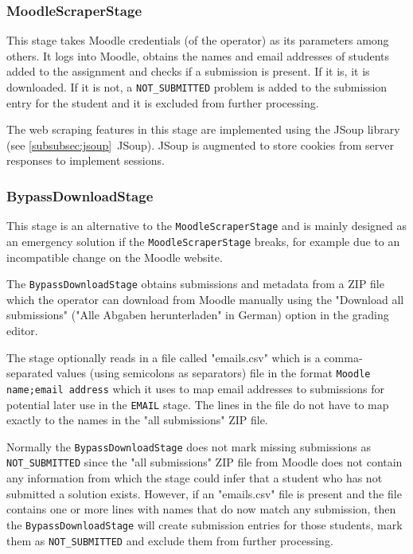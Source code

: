 \documentclass[12pt,a4paper,oneside]{report}
\begin{document}
	\subsubsection{MoodleScraperStage}
	This stage takes Moodle credentials (of the operator) as its parameters among others. It logs into Moodle, obtains the names and email addresses of students added to the assignment and checks if a submission is present. If it is, it is downloaded. If it is not, a \lstinline|NOT_SUBMITTED| problem is added to the submission entry for the student and it is excluded from further processing.

	The web scraping features in this stage are implemented using the JSoup library (see \ref{subsubsec:jsoup}~JSoup). JSoup is augmented to store cookies from server responses to implement sessions.

	\subsubsection{BypassDownloadStage}
	This stage is an alternative to the \lstinline|MoodleScraperStage| and is mainly designed as an emergency solution if the \lstinline|MoodleScraperStage| breaks, for example due to an incompatible change on the Moodle website.

	The \lstinline|BypassDownloadStage| obtains submissions and metadata from a ZIP file which the operator can download from Moodle manually using the "Download all submissions" ("Alle Abgaben herunterladen" in German) option in the grading editor.

	The stage optionally reads in a file called "emails.csv" which is a comma-separated values (using semicolons as separators) file in the format \lstinline|Moodle name;email address| which it uses to map email addresses to submissions for potential later use in the \lstinline|EMAIL| stage. The lines in the file do not have to map exactly to the names in the "all submissions" ZIP file.

	Normally the \lstinline|BypassDownloadStage| does not mark missing submissions as \linebreak\lstinline|NOT_SUBMITTED| since the "all submissions" ZIP file from Moodle does not contain any information from which the stage could infer that a student who has not submitted a solution exists. However, if an "emails.csv" file is present and the file contains one or more lines with names that do now match any submission, then the \lstinline|BypassDownloadStage| will create submission entries for those students, mark them as \lstinline|NOT_SUBMITTED| and exclude them from further processing.
\end{document}
